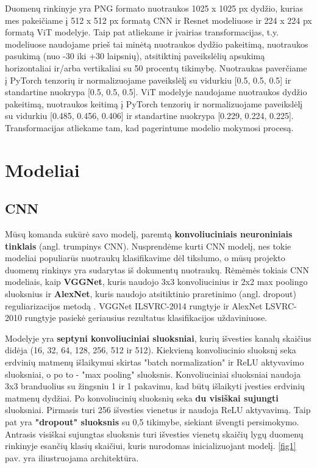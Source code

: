 \documentclass[conference]{IEEEtran}
\begin{document}
Duomenų rinkinyje yra PNG formato nuotraukos 1025 x 1025 px dydžio, kurias mes pakeičiame į 512 x 512 px formatą CNN ir Resnet modeliuose ir 224 x 224 px formatą ViT modelyje. Taip pat atliekame ir įvairias transformacijas, t.y. modeliuose naudojame prieš tai minėtą nuotraukos dydžio pakeitimą, nuotraukos pasukimą (nuo -30 iki +30 laipsnių), atsitiktinį paveikslėlių apsukimą horizontaliai ir/arba vertikaliai su 50 procentų tikimybę. Nuotraukas paverčiame į PyTorch tenzorių ir normalizuojame paveikslėlį su vidurkiu [0.5, 0.5, 0.5] ir standartine nuokrypa [0.5, 0.5, 0.5]. ViT modelyje naudojame nuotraukos dydžio pakeitimą, nuotraukos keitimą į PyTorch tenzorių ir normalizuojame paveikslėlį su vidurkiu [0.485, 0.456, 0.406] ir standartine nuokrypa [0.229, 0.224, 0.225]. Transformacijas atliekame tam, kad pagerintume modelio mokymosi procesą.

\section{Modeliai}

\subsection{CNN}

Mūsų komanda sukūrė savo modelį, paremtą \textbf{konvoliuciniais neuroniniais tinklais} (angl. trumpinys CNN). Nusprendėme kurti CNN modelį, nes tokie modeliai populiarūs nuotraukų klasifikavime dėl tikslumo, o mūsų projekto duomenų rinkinys yra sudarytas iš dokumentų nuotraukų. Rėmėmės tokiais CNN modeliais, kaip \textbf{VGGNet}, kuris naudojo 3x3 konvoliucinius ir 2x2 max poolingo sluoksnius \cite{simonyan2015deep} ir \textbf{AlexNet}, kuris naudojo atsitiktinio praretinimo (angl. dropout) reguliarizacijos metodą \cite{alexNet}. VGGNet ILSVRC-2014 rungtyje ir AlexNet LSVRC-2010 rungtyje pasiekė geriausius rezultatus klasifikacijos uždaviniuose.

Modelyje yra \textbf{septyni konvoliuciniai sluoksniai}, kurių išvesties kanalų skaičius didėja (16, 32, 64, 128, 256, 512 ir 512). Kiekvieną konvoliucinio sluoksnį seka erdvinių matmenų išlaikymui skirtas "batch normalization" ir ReLU aktyvavimo sluoksniai, o po to - "max pooling" sluoksnis. Konvoliuciniai sluoksniai naudoja 3x3 branduolius su žingsniu 1 ir 1 pakavimu, kad būtų išlaikyti įvesties erdvinių matmenų dydžiai. Po konvoliucinių sluoksnių seka \textbf{du visiškai sujungti} sluoksniai. Pirmasis turi 256 išvesties vienetus ir naudoja ReLU aktyvavimą. Taip pat yra \textbf{"dropout" sluoksnis} su 0,5 tikimybe, siekiant išvengti persimokymo. Antrasis visiškai sujungtas sluoksnis turi išvesties vienetų skaičių lygų duomenų rinkinyje esančių klasių skaičiui, kuris nurodomas inicializuojant modelį. \ref{fig1} pav. yra iliustruojama architektūra.
\end{document}

